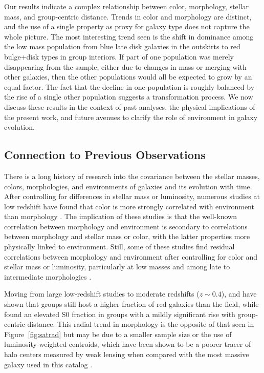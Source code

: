 \documentclass[12pt]{emulateapj}
\begin{document}
Our results indicate a complex relationship between color, morphology,
stellar mass, and group-centric distance. Trends in color and
morphology are distinct, and the use of a single property as proxy for
galaxy type does not capture the whole picture. The most interesting
trend seen is the shift in dominance among the low mass population
from blue late disk galaxies in the outskirts to red bulge+disk types
in group interiors. If part of one population was merely disappearing
from the sample, either due to changes in mass or merging with other
galaxies, then the other populations would all be expected to grow by
an equal factor. The fact that the decline in one population is
roughly balanced by the rise of a single other population suggests a
transformation process. We now discuss these results in the context of
past analyses, the physical implications of the present work, and
future avenues to clarify the role of environment in galaxy evolution.

\subsection{Connection to Previous Observations}

There is a long history of research into the covariance between the
stellar masses, colors, morphologies, and environments of galaxies and
its evolution with time. After controlling for differences in stellar
mass or luminosity, numerous studies at low redshift have found that color is more
strongly correlated with environment than morphology
\citep[e.g.,][]{Kauffmann2004, Blanton2005, Christlein2005, vandenBosch2008,
  Bamford2009, Skibba2009, Weinmann2009}. The implication of these
studies is that the well-known correlation between morphology and
environment is secondary to correlations between morphology and
stellar mass or color, with the latter properties more physically
linked to environment. Still, some of these studies find residual
correlations between morphology and environment after controlling for
color and stellar mass or luminosity, particularly at low masses and
among late to intermediate morphologies \citep{Blanton2005,
  Weinmann2009, Skibba2012}.

Moving from large low-redshift studies to moderate redshifts ($z\sim0.4$), \citet{Balogh2009} and
\citet{McGee2011} have shown that groups still host a higher fraction of red
galaxies than the field, while \citet{Wilman2009} found
an elevated S0 fraction in groups with a mildly significant rise with
group-centric distance. This radial trend in morphology is the opposite of that seen
in Figure~\ref{fig:satrad} but may be due to a smaller sample size or
the use of luminosity-weighted centroids, which have been shown to be
a poorer tracer of halo centers measured by weak lensing when compared
with the most massive galaxy used in this catalog \citep{George2012}.
\end{document}
